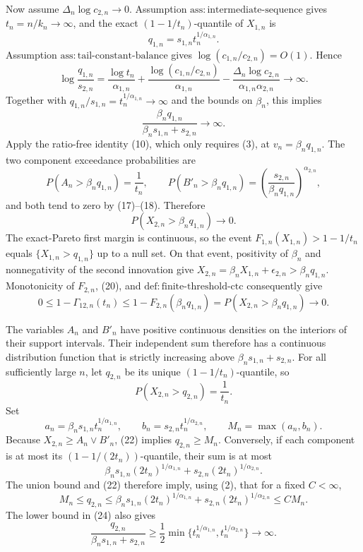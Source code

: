 Now assume \(\Delta_n\log c_{2,n}\to0\). Assumption \(\mathrm{ass{:}intermediate\text{-}sequence}\) gives \(t_n=n/k_n\to\infty\), and the exact \((1-1/t_n)\)-quantile of \(X_{1,n}\) is
\[
q_{1,n}=s_{1,n}t_n^{1/\alpha_{1,n}}.
\tag{16}
\]
Assumption \(\mathrm{ass{:}tail\text{-}constant\text{-}balance}\) gives \(\log(c_{1,n}/c_{2,n})=O(1)\). Hence
\[
\log\frac{q_{1,n}}{s_{2,n}}
=\frac{\log t_n}{\alpha_{1,n}}
+\frac{\log(c_{1,n}/c_{2,n})}{\alpha_{1,n}}
-\frac{\Delta_n\log c_{2,n}}{\alpha_{1,n}\alpha_{2,n}}
\longrightarrow\infty.
\tag{17}
\]
Together with \(q_{1,n}/s_{1,n}=t_n^{1/\alpha_{1,n}}\to\infty\) and the bounds on \(\beta_n\), this implies
\[
\frac{\beta_nq_{1,n}}{\beta_ns_{1,n}+s_{2,n}}\to\infty.
\tag{18}
\]
Apply the ratio-free identity (10), which only requires (3), at \(v_n=\beta_nq_{1,n}\). The two component exceedance probabilities are
\[
P(A_n>\beta_nq_{1,n})=\frac1{t_n},
\qquad
P(B'_n>\beta_nq_{1,n})
=\left(\frac{s_{2,n}}{\beta_nq_{1,n}}\right)^{\alpha_{2,n}},
\tag{19}
\]
and both tend to zero by (17)--(18). Therefore
\[
P(X_{2,n}>\beta_nq_{1,n})\to0.
\tag{20}
\]
The exact-Pareto first margin is continuous, so the event \(F_{1,n}(X_{1,n})>1-1/t_n\) equals \(\{X_{1,n}>q_{1,n}\}\) up to a null set. On that event, positivity of \(\beta_n\) and nonnegativity of the second innovation give \(X_{2,n}=\beta_nX_{1,n}+\epsilon_{2,n}>\beta_nq_{1,n}\). Monotonicity of \(F_{2,n}\), (20), and \(\mathrm{def{:}finite\text{-}threshold\text{-}ctc}\) consequently give
\[
0\leq1-\Gamma_{12,n}(t_n)
\leq1-F_{2,n}(\beta_nq_{1,n})
=P(X_{2,n}>\beta_nq_{1,n})\to0.
\tag{21}
\]

The variables \(A_n\) and \(B'_n\) have positive continuous densities on the interiors of their support intervals. Their independent sum therefore has a continuous distribution function that is strictly increasing above \(\beta_ns_{1,n}+s_{2,n}\). For all sufficiently large \(n\), let \(q_{2,n}\) be its unique \((1-1/t_n)\)-quantile, so
\[
P(X_{2,n}>q_{2,n})=\frac1{t_n}.
\tag{22}
\]
Set
\[
a_n=\beta_ns_{1,n}t_n^{1/\alpha_{1,n}},
\qquad b_n=s_{2,n}t_n^{1/\alpha_{2,n}},
\qquad M_n=\max(a_n,b_n).
\tag{23}
\]
Because \(X_{2,n}\geq A_n\vee B'_n\), (22) implies \(q_{2,n}\geq M_n\). Conversely, if each component is at most its \((1-1/(2t_n))\)-quantile, their sum is at most
\[
\beta_ns_{1,n}(2t_n)^{1/\alpha_{1,n}}
+s_{2,n}(2t_n)^{1/\alpha_{2,n}}.
\]
The union bound and (22) therefore imply, using (2), that for a fixed \(C<\infty\),
\[
M_n\leq q_{2,n}
\leq\beta_ns_{1,n}(2t_n)^{1/\alpha_{1,n}}
+s_{2,n}(2t_n)^{1/\alpha_{2,n}}
\leq CM_n.
\tag{24}
\]
The lower bound in (24) also gives
\[
\frac{q_{2,n}}{\beta_ns_{1,n}+s_{2,n}}
\geq\frac12\min\{t_n^{1/\alpha_{1,n}},t_n^{1/\alpha_{2,n}}\}
\longrightarrow\infty.
\tag{25}
\]

